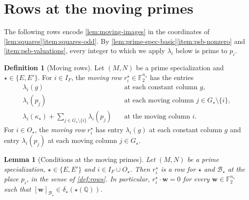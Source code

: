 \documentclass[12pt,oneside,openany]{book}
\theoremstyle{definition}
\theoremstyle{plain}
\numberwithin{equation}{chapter}
\theoremstyle{plain}
\newtheorem{lemma}[lemma]{Lemma}
\theoremstyle{definition}
\newtheorem{definition}[definition]{Definition}
\theoremstyle{remark}
\newcommand{\Q}{\mathbb Q}
\newcommand{\F}{\mathbb F}
\newcommand{\sq}[1]{[#1]}
\newcommand{\cB}{\mathcal B}
\begin{document}
\section{Rows at the moving primes}\label{sec:families-rows}

The following rows encode \cref{lem:moving-images} in the coordinates of \cref{lem:squares}\ref{item:squares-odd}. By \cref{lem:prime-spec-basic}\ref{item:psb-nonzero} and \ref{item:psb-valuations}, every integer to which we apply $\lambda_i$ below is prime to $p_i$.

\begin{definition}[Moving rows]\label{def:moving-rows}
Let $(M,N)$ be a prime specialization and $\star\in\{E,E'\}$. For $i\in I_F$, the \emph{moving row} $r^\star_i\in\F_2^{n_\star}$ has the entries
\begin{equation}\label{eq:moving-row-F}
\begin{array}{ll}
\lambda_i(g) & \text{at each constant column }g,\\
\lambda_i(p_j) & \text{at each moving column }j\in G_\star\setminus\{i\},\\
\lambda_i(\kappa_\star)+\sum_{j\in G_\star\setminus\{i\}}\lambda_i(p_j)\quad & \text{at the moving column }i.
\end{array}
\end{equation}
For $i\in O_\star$, the \emph{moving row} $r^\star_i$ has entry $\lambda_i(g)$ at each constant column $g$ and entry $\lambda_i(p_j)$ at each moving column $j\in G_\star$.
\end{definition}

\begin{lemma}[Conditions at the moving primes]\label{lem:moving-rows}
Let $(M,N)$ be a prime specialization, $\star\in\{E,E'\}$ and $i\in I_F\cup O_\star$. Then $r^\star_i$ is a row for $\star$ and $\cB_\star$ at the place $p_i$, in the sense of \cref{def:rows}. In particular, $r^\star_i\cdot\mathbf w=0$ for every $\mathbf w\in\F_2^{n_\star}$ such that $\sq{\mathbf w}_{\cB_\star}\in\delta_\star(\star(\Q))$.
\end{lemma}
\end{document}
